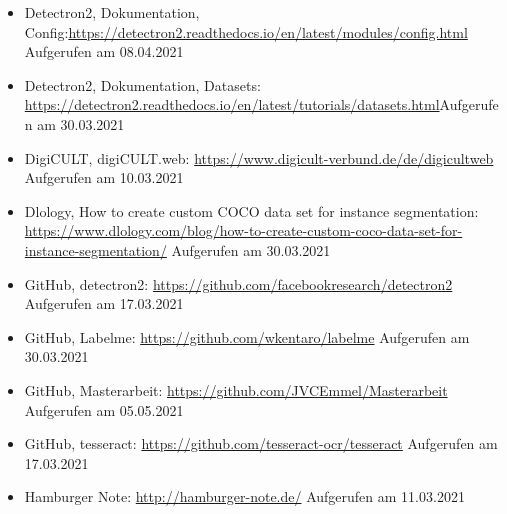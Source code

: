 \documentclass[a4paper,12pt,ngerman]{article}
\begin{document}
\begin{itemize}
\item Detectron2, Dokumentation, Config:\newline \href{https://detectron2.readthedocs.io/en/latest/modules/config.html}{https://detectron2.readthedocs.io/en/latest/modules/config.html} \newline Aufgerufen am 08.04.2021
\item Detectron2, Dokumentation, Datasets: \newline \href{https://detectron2.readthedocs.io/en/latest/tutorials/datasets.html}{https://detectron2.readthedocs.io/en/latest/tutorials/datasets.html}\newline Aufgerufen am 30.03.2021
\item DigiCULT, digiCULT.web: \newline \href{https://www.digicult-verbund.de/de/digicultweb}{https://www.digicult-verbund.de/de/digicultweb} \newline Aufgerufen am 10.03.2021
\item Dlology, How to create custom COCO data set for instance segmentation: \newline \href{https://www.dlology.com/blog/how-to-create-custom-coco-data-set-for-instance-segmentation/}{https://www.dlology.com/blog/how-to-create-custom-coco-data-set-for-instance-segmentation/} \newline Aufgerufen am 30.03.2021
\item GitHub, detectron2: \newline \href{https://github.com/facebookresearch/detectron2}{https://github.com/facebookresearch/detectron2} \newline Aufgerufen am 17.03.2021
\item GitHub, Labelme: \newline \href{https://github.com/wkentaro/labelme}{https://github.com/wkentaro/labelme} \newline Aufgerufen am 30.03.2021
\item GitHub, Masterarbeit: \newline \href{https://github.com/JVCEmmel/Masterarbeit}{https://github.com/JVCEmmel/Masterarbeit} \newline Aufgerufen am 05.05.2021
\item GitHub, tesseract: \newline \href{https://github.com/tesseract-ocr/tesseract}{https://github.com/tesseract-ocr/tesseract} \newline Aufgerufen am 17.03.2021
\item Hamburger Note: \newline \href{http://hamburger-note.de/}{http://hamburger-note.de/} \newline Aufgerufen am 11.03.2021

\end{itemize}
\end{document}
